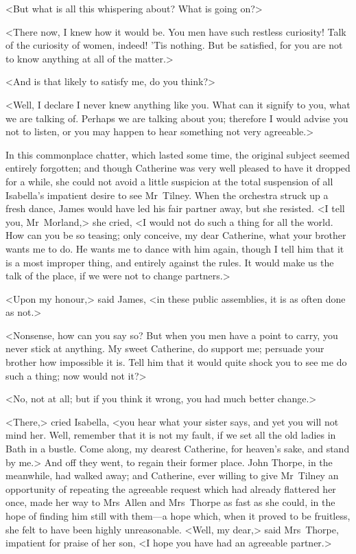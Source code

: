  <But what is all this whispering about? What is going on?> 

 <There now, I knew how it would be. You men have such restless curiosity! Talk of the curiosity of women, indeed! 'Tis nothing. But be satisfied, for you are not to know anything at all of the matter.> 

 <And is that likely to satisfy me, do you think?> 

 <Well, I declare I never knew anything like you. What can it signify to you, what we are talking of. Perhaps we are talking about you; therefore I would advise you not to listen, or you may happen to hear something not very agreeable.> 

 In this commonplace chatter, which lasted some time, the original subject seemed entirely forgotten; and though Catherine was very well pleased to have it dropped for a while, she could not avoid a little suspicion at the total suspension of all Isabella's impatient desire to see Mr~Tilney. When the orchestra struck up a fresh dance, James would have led his fair partner away, but she resisted. <I tell you, Mr~Morland,> she cried, <I would not do such a thing for all the world. How can you be so teasing; only conceive, my dear Catherine, what your brother wants me to do. He wants me to dance with him again, though I tell him that it is a most improper thing, and entirely against the rules. It would make us the talk of the place, if we were not to change partners.> 

 <Upon my honour,> said James, <in these public assemblies, it is as often done as not.> 

 <Nonsense, how can you say so? But when you men have a point to carry, you never stick at anything. My sweet Catherine, do support me; persuade your brother how impossible it is. Tell him that it would quite shock you to see me do such a thing; now would not it?> 

 <No, not at all; but if you think it wrong, you had much better change.> 

 <There,> cried Isabella, <you hear what your sister says, and yet you will not mind her. Well, remember that it is not my fault, if we set all the old ladies in Bath in a bustle. Come along, my dearest Catherine, for heaven's sake, and stand by me.> And off they went, to regain their former place. John Thorpe, in the meanwhile, had walked away; and Catherine, ever willing to give Mr~Tilney an opportunity of repeating the agreeable request which had already flattered her once, made her way to Mrs~Allen and Mrs~Thorpe as fast as she could, in the hope of finding him still with them—a hope which, when it proved to be fruitless, she felt to have been highly unreasonable. <Well, my dear,> said Mrs~Thorpe, impatient for praise of her son, <I hope you have had an agreeable partner.> 


